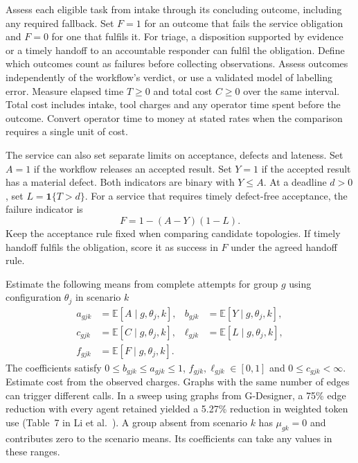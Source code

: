 \documentclass[11pt,reqno]{amsart}
\theoremstyle{definition}
\theoremstyle{remark}
\newcommand{\ind}{\mathbf 1}
\begin{document}
Assess each eligible task from intake through its concluding outcome, including any required fallback. Set $F=1$ for an outcome that fails the service obligation and $F=0$ for one that fulfils it. For triage, a disposition supported by evidence or a timely handoff to an accountable responder can fulfil the obligation.
Define which outcomes count as failures before collecting observations. Assess outcomes independently of the workflow's verdict, or use a validated model of labelling error.
Measure elapsed time $T\ge0$ and total cost $C\ge0$ over the same interval. Total cost includes intake, tool charges and any operator time spent before the outcome. Convert operator time to money at stated rates when the comparison requires a single unit of cost.

The service can also set separate limits on acceptance, defects and lateness. Set $A=1$ if the workflow releases an accepted result. Set $Y=1$ if the accepted result has a material defect. Both indicators are binary with $Y\le A$. At a deadline $d>0$, set $L=\ind\{T>d\}$. For a service that requires timely defect-free acceptance, the failure indicator is
\begin{equation}
 F=1-(A-Y)(1-L).
 \label{eq:joint-failure}
\end{equation}
Keep the acceptance rule fixed when comparing candidate topologies. If timely handoff fulfils the obligation, score it as success in $F$ under the agreed handoff rule.

\FloatBarrier
Estimate the following means from complete attempts for group $g$ using configuration $\theta_j$ in scenario $k$
\begin{equation}
 \begin{aligned}
 a_{gjk}&=\mathbb E[A\mid g,\theta_j,k],&
 b_{gjk}&=\mathbb E[Y\mid g,\theta_j,k],\\
 c_{gjk}&=\mathbb E[C\mid g,\theta_j,k],&
 \ell_{gjk}&=\mathbb E[L\mid g,\theta_j,k],\\
 f_{gjk}&=\mathbb E[F\mid g,\theta_j,k].&
 \end{aligned}
 \label{eq:outcomes}
\end{equation}
The coefficients satisfy $0\le b_{gjk}\le a_{gjk}\le1$, $f_{gjk},\ell_{gjk}\in[0,1]$ and $0\le c_{gjk}<\infty$.
Estimate cost from the observed charges. Graphs with the same number of edges can trigger different calls.
In a sweep using graphs from G-Designer, a 75\% edge reduction with every agent retained yielded a 5.27\% reduction in weighted token use (Table~7 in Li et al.~\cite{e2explainer2026}).
A group absent from scenario $k$ has $\mu_{gk}=0$ and contributes zero to the scenario means. Its coefficients can take any values in these ranges.
\end{document}
